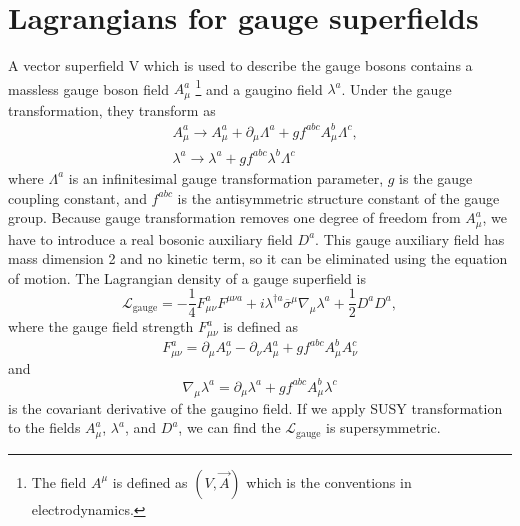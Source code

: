 \documentclass[12pt]{report}
\begin{document}
\section{Lagrangians for gauge superfields}
A vector superfield V which is used to describe the gauge bosons contains a massless gauge boson field $A^{a}_{\mu}$ \footnote{The field $A^{\mu}$ is defined as $(V, \vec{A})$ which is the conventions in electrodynamics.} and a gaugino field $\lambda^{a}$.
Under the gauge transformation, they transform as
\begin{align}
& A^{a}_{\mu} \to A^{a}_{\mu} + \partial_{\mu} \Lambda^{a} + g f^{abc} A^{b}_{\mu} \Lambda^{c} ,\\
& \lambda^{a} \to \lambda^{a} + g f^{abc} \lambda^{b} \Lambda^{c}
\end{align}
where $\Lambda^{a}$ is an infinitesimal gauge transformation parameter, $g$ is the gauge coupling constant, and $f^{abc}$ is the antisymmetric structure constant of the gauge group.
Because gauge transformation removes one degree of freedom from $A^{a}_{\mu}$, we have to introduce a real bosonic auxiliary field $D^{a}$.
This gauge auxiliary field has mass dimension 2 and no kinetic term, so it can be eliminated using the equation of motion.
The Lagrangian density of a gauge superfield is
\begin{equation} \label{eq: L_gauge}
\mathcal{L}_{\mathrm{gauge}} = - \frac{1}{4} F^{a}_{\mu \nu} F^{\mu \nu a} + i \lambda^{\dag a} \overline{\sigma}^{\mu} \nabla_{\mu} \lambda^{a} + \frac{1}{2} D^{a} D^{a} ,
\end{equation}
where the gauge field strength $F^{a}_{\mu \nu}$ is defined as
\begin{equation} \label{eq: gauge field strength}
F^{a}_{\mu \nu} = \partial_{\mu} A^{a}_{\nu} - \partial_{\nu} A^{a}_{\mu} + g f^{abc} A^{b}_{\mu} A^{c}_{\nu}
\end{equation}
and
\begin{equation}
\nabla_{\mu} \lambda^{a} = \partial_{\mu} \lambda^{a} + g f^{abc} A^{b}_{\mu} \lambda^{c}
\end{equation}
is the covariant derivative of the gaugino field.
If we apply SUSY transformation to the fields $A^{a}_{\mu}$, $\lambda^{a}$, and $D^{a}$, we can find the $\mathcal{L}_{\mathrm{gauge}}$ is supersymmetric.
\end{document}

